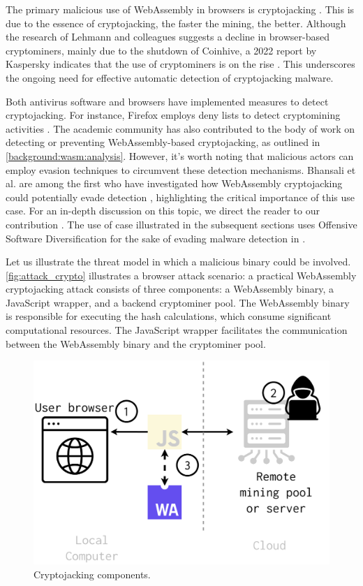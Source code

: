 
The primary malicious use of WebAssembly in browsers is cryptojacking \cite{musch2019new}. 
This is due to the essence of cryptojacking, the faster the mining, the better. 
Although the research of Lehmann and colleagues \cite{Hilbig2021AnES} suggests a decline in browser-based cryptominers, mainly due to the shutdown of Coinhive, a 2022 report by Kaspersky indicates that the use of cryptominers is on the rise \cite{kasperksy}. 
This underscores the ongoing need for effective automatic detection of cryptojacking malware.


Both antivirus software and browsers have implemented measures to detect cryptojacking. For instance, Firefox employs deny lists to detect cryptomining activities \cite{firefoxcrypto}. 
The academic community has also contributed to the body of work on detecting or preventing WebAssembly-based cryptojacking, as outlined in \autoref{background:wasm:analysis}. 
However, it's worth noting that malicious actors can employ evasion techniques to circumvent these detection mechanisms. 
Bhansali et al. are among the first who have investigated how WebAssembly cryptojacking could potentially evade detection \cite{10.1145/3507657.3528560}, highlighting the critical importance of this use case. 
For an in-depth discussion on this topic, we direct the reader to our contribution \cite{EVASION}.
The use of case illustrated in the subsequent sections uses Offensive Software Diversification for the sake of evading malware detection in \Wasm. 


\label{threat_model}

Let us illustrate the threat model in which a malicious \wasm binary could be involved.
\autoref{fig:attack_crypto} illustrates a browser attack scenario:
a practical WebAssembly cryptojacking attack consists of three components: a WebAssembly binary, a JavaScript wrapper, and a backend cryptominer pool. 
The WebAssembly binary is responsible for executing the hash calculations, which consume significant computational resources. 
The JavaScript wrapper facilitates the communication between the WebAssembly binary and the cryptominer pool.

\begin{figure}[h]
    \centering
    \includegraphics[width=0.6\linewidth]{figures/attack_crypto.pdf}
    \caption{Cryptojacking components.}
    \label{fig:attack_crypto}
\end{figure}

